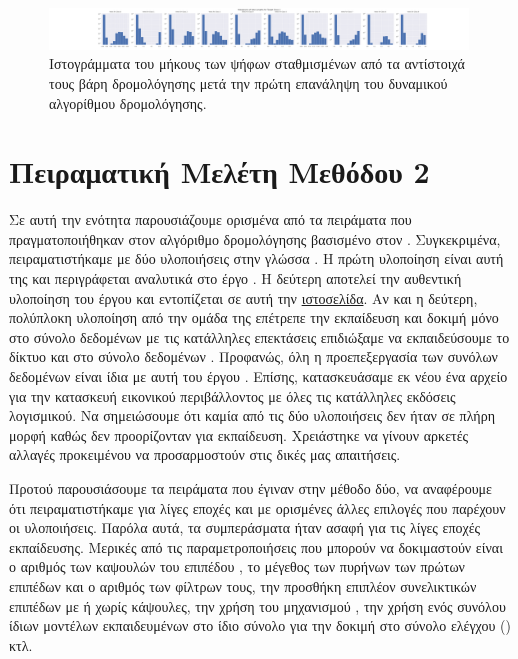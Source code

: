   \begin{figure}[h]
    \centering
    \includegraphics[trim={14cm 0 13cm 0},clip, width=0.99\textwidth]{images/chapter experiments/method 1/image 14/hists_for_class_1_r_1.png}
    \caption{Ιστογράμματα του μήκους των ψήφων σταθμισμένων από τα αντίστοιχά τους βάρη δρομολόγησης μετά την πρώτη επανάληψη του δυναμικού αλγορίθμου δρομολόγησης.}
    \label{fig:exp_method_1_special_hist_r_1}
  \end{figure}


\section{Πειραματική Μελέτη Μεθόδου 2}
Σε αυτή την ενότητα παρουσιάζουμε ορισμένα από τα πειράματα που πραγματοποιήθηκαν στον αλγόριθμο δρομολόγησης βασισμένο στον . Συγκεκριμένα, πειραματιστήκαμε με δύο υλοποιήσεις στην γλώσσα . Η πρώτη υλοποίηση είναι αυτή της  και περιγράφεται αναλυτικά στο έργο \cite{gritzman2019avoiding}. Η δεύτερη αποτελεί την αυθεντική υλοποίηση του έργου \cite{hinton2018matrix} και εντοπίζεται σε αυτή την \href{https://git.informatik.uni-hamburg.de/0moin/google-research/-/commits/master/capsule_em}{ιστοσελίδα}. Αν και η δεύτερη, πολύπλοκη υλοποίηση από την ομάδα της  επέτρεπε την εκπαίδευση και δοκιμή μόνο στο σύνολο δεδομένων  με τις κατάλληλες επεκτάσεις επιδιώξαμε να εκπαιδεύσουμε το δίκτυο και στο σύνολο δεδομένων . Προφανώς, όλη η προεπεξεργασία των συνόλων δεδομένων είναι ίδια με αυτή του έργου \cite{hinton2018matrix}. Επίσης, κατασκευάσαμε εκ νέου ένα αρχείο  για την κατασκευή εικονικού περιβάλλοντος με όλες τις κατάλληλες εκδόσεις λογισμικού. Να σημειώσουμε ότι καμία από τις δύο υλοποιήσεις δεν ήταν σε πλήρη μορφή καθώς δεν προορίζονταν για εκπαίδευση. Χρειάστηκε να γίνουν αρκετές αλλαγές προκειμένου να προσαρμοστούν στις δικές μας απαιτήσεις.\par

Προτού παρουσιάσουμε τα πειράματα που έγιναν στην μέθοδο δύο, να αναφέρουμε ότι πειραματιστήκαμε για λίγες εποχές και με ορισμένες άλλες επιλογές που παρέχουν οι υλοποιήσεις. Παρόλα αυτά, τα συμπεράσματα ήταν ασαφή για τις λίγες εποχές εκπαίδευσης. Μερικές από τις παραμετροποιήσεις που μπορούν να δοκιμαστούν είναι ο αριθμός των καψουλών του επιπέδου , το μέγεθος των πυρήνων των πρώτων επιπέδων και ο αριθμός των φίλτρων τους, την προσθήκη επιπλέον συνελικτικών επιπέδων με ή χωρίς κάψουλες, την χρήση του μηχανισμού , την χρήση ενός συνόλου ίδιων μοντέλων εκπαιδευμένων στο ίδιο σύνολο για την δοκιμή στο σύνολο ελέγχου () κτλ.\par

